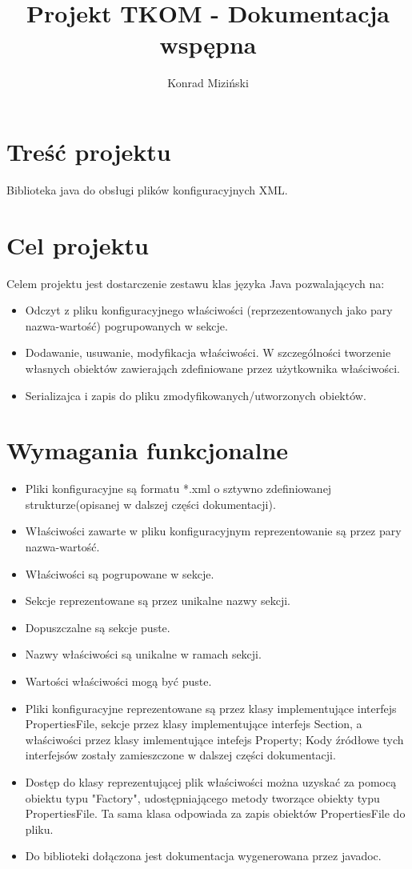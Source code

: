 \documentclass{article}
\author{Konrad Miziński}
\title{Projekt TKOM - Dokumentacja wspępna}
\begin{document}
\maketitle


\tableofcontents
\newpage
\section{Treść projektu}
Biblioteka java do obsługi plików konfiguracyjnych XML.

\section{Cel projektu}
Celem projektu jest dostarczenie zestawu klas języka Java pozwalających na:
\begin{itemize}
	\item Odczyt z pliku konfiguracyjnego właściwości (reprzezentowanych jako pary nazwa-wartość)
	pogrupowanych w sekcje.
	\item Dodawanie, usuwanie, modyfikacja właściwości. W szczególności tworzenie własnych obiektów 
	zawierająch zdefiniowane przez użytkownika właściwości.
	\item Serializajca i zapis do pliku zmodyfikowanych/utworzonych obiektów.
\end{itemize}

\section{Wymagania funkcjonalne}
\begin{itemize}
	\item Pliki konfiguracyjne są formatu *.xml o sztywno zdefiniowanej strukturze(opisanej 
	w dalszej części dokumentacji).
	\item Właściwości zawarte w pliku konfiguracyjnym reprezentowanie są przez pary nazwa-wartość.
	\item Właściwości są pogrupowane w sekcje.
	\item Sekcje reprezentowane są przez unikalne nazwy sekcji.
	\item Dopuszczalne są sekcje puste.
	\item Nazwy właściwości są unikalne w ramach sekcji.
	\item Wartości właściwości mogą być puste.
	\item Pliki konfiguracyjne reprezentowane są przez klasy implementujące interfejs PropertiesFile,
	sekcje przez klasy implementujące interfejs Section,
	a właściwości przez klasy imlementujące intefejs Property;
	Kody źródłowe tych interfejsów zostały zamieszczone w dalszej części dokumentacji.
	\item Dostęp do klasy reprezentującej plik właściwości można uzyskać za pomocą obiektu typu
	"Factory", udostępniającego metody tworzące obiekty typu PropertiesFile.
	Ta sama klasa odpowiada za zapis obiektów PropertiesFile do pliku. 
	\item Do biblioteki dołączona jest dokumentacja wygenerowana przez javadoc.
\end{itemize}
\end{document}
